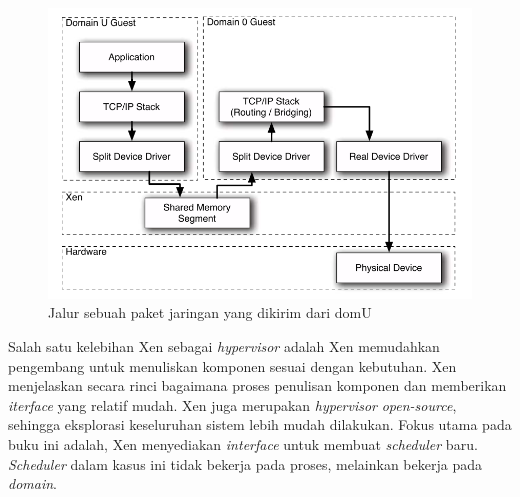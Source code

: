 \begin{figure}[htbp]
    \includegraphics[scale=0.5]{./resources/xen-split-driver.png}
    \caption[Jalur sebuah paket jaringan yang dikirim dari domU]{Jalur sebuah paket jaringan yang dikirim dari domU \citep{Chisnall2014}}
    \label{figure:xen_split_driver}
\end{figure}

Salah satu kelebihan Xen sebagai \textit{hypervisor} adalah Xen memudahkan pengembang untuk menuliskan komponen sesuai dengan kebutuhan.
Xen menjelaskan secara rinci bagaimana proses penulisan komponen dan memberikan \textit{iterface} yang relatif mudah.
Xen juga merupakan \textit{hypervisor} \textit{open-source}, sehingga eksplorasi keseluruhan sistem lebih mudah dilakukan.
Fokus utama pada buku ini adalah, Xen menyediakan \textit{interface} untuk membuat \textit{scheduler} baru.
\textit{Scheduler} dalam kasus ini tidak bekerja pada proses, melainkan bekerja pada \textit{domain}.

